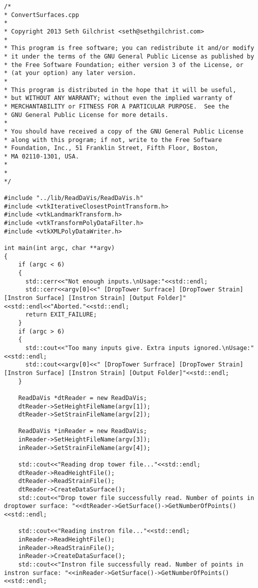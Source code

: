 \begin{lstlisting}
/*
* ConvertSurfaces.cpp
*
* Copyright 2013 Seth Gilchrist <seth@sethgilchrist.com>
*
* This program is free software; you can redistribute it and/or modify
* it under the terms of the GNU General Public License as published by
* the Free Software Foundation; either version 3 of the License, or
* (at your option) any later version.
*
* This program is distributed in the hope that it will be useful,
* but WITHOUT ANY WARRANTY; without even the implied warranty of
* MERCHANTABILITY or FITNESS FOR A PARTICULAR PURPOSE.  See the
* GNU General Public License for more details.
*
* You should have received a copy of the GNU General Public License
* along with this program; if not, write to the Free Software
* Foundation, Inc., 51 Franklin Street, Fifth Floor, Boston,
* MA 02110-1301, USA.
*
*
*/

#include "../lib/ReadDaVis/ReadDaVis.h"
#include <vtkIterativeClosestPointTransform.h>
#include <vtkLandmarkTransform.h>
#include <vtkTransformPolyDataFilter.h>
#include <vtkXMLPolyDataWriter.h>
		
int main(int argc, char **argv)
{
	if (argc < 6)
	{
	  std::cerr<<"Not enough inputs.\nUsage:"<<std::endl;
	  std::cerr<<argv[0]<<" [DropTower Surfrace] [DropTower Strain] [Instron Surface] [Instron Strain] [Output Folder]"<<std::endl<<"Aborted."<<std::endl;
	  return EXIT_FAILURE;
	}
	if (argc > 6)
	{
	  std::cout<<"Too many inputs give. Extra inputs ignored.\nUsage:"<<std::endl;
	  std::cout<<argv[0]<<" [DropTower Surfrace] [DropTower Strain] [Instron Surface] [Instron Strain] [Output Folder]"<<std::endl;
	}
	
	ReadDaVis *dtReader = new ReadDaVis;
	dtReader->SetHeightFileName(argv[1]);
	dtReader->SetStrainFileName(argv[2]);
	
	ReadDaVis *inReader = new ReadDaVis;
	inReader->SetHeightFileName(argv[3]);
	inReader->SetStrainFileName(argv[4]);
	
	std::cout<<"Reading drop tower file..."<<std::endl;
	dtReader->ReadHeightFile();
	dtReader->ReadStrainFile();
	dtReader->CreateDataSurface();
	std::cout<<"Drop tower file successfully read. Number of points in droptower surface: "<<dtReader->GetSurface()->GetNumberOfPoints()<<std::endl;
	
	std::cout<<"Reading instron file..."<<std::endl;
	inReader->ReadHeightFile();
	inReader->ReadStrainFile();
	inReader->CreateDataSurface();
	std::cout<<"Instron file successfully read. Number of points in instron surface: "<<inReader->GetSurface()->GetNumberOfPoints()<<std::endl;
	

\end{lstlisting}
